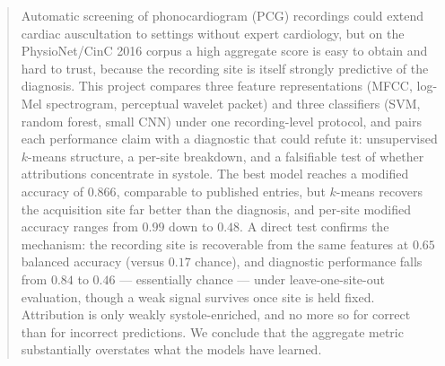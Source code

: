 \begin{abstract}
Automatic screening of phonocardiogram (PCG) recordings could extend cardiac
auscultation to settings without expert cardiology, but on the PhysioNet/CinC
2016 corpus a high aggregate score is easy to obtain and hard to trust, because
the recording site is itself strongly predictive of the diagnosis. This project
compares three feature representations (MFCC, log-Mel spectrogram, perceptual
wavelet packet) and three classifiers (SVM, random forest, small CNN) under one
recording-level protocol, and pairs each performance claim with a diagnostic
that could refute it: unsupervised $k$-means structure, a per-site breakdown,
and a falsifiable test of whether attributions concentrate in systole. The best
model reaches a modified accuracy of $0.866$, comparable to published entries,
but $k$-means recovers the acquisition site far better than the diagnosis, and
per-site modified accuracy ranges from $0.99$ down to $0.48$. A direct test
confirms the mechanism: the recording site is recoverable from the same
features at $0.65$ balanced accuracy (versus $0.17$ chance), and diagnostic performance falls
from $0.84$ to $0.46$ --- essentially chance --- under leave-one-site-out
evaluation, though a weak signal survives once site is held fixed. Attribution is
only weakly systole-enriched, and no more so for correct than for incorrect
predictions. We conclude that the aggregate metric substantially overstates what the models
have learned.
\end{abstract}

